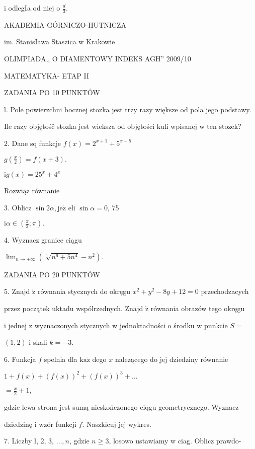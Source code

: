 \documentclass[a4paper,12pt]{article}
\begin{document}
i odlegIa od niej o $\displaystyle \frac{d}{3}.$






AKADEMIA GÓRNICZO-HUTNICZA

im. StanisIawa Staszica w Krakowie

OLIMPIADA,, O DIAMENTOWY INDEKS AGH'' 2009/10

MATEMATYKA- ETAP II

ZADANIA PO 10 PUNKTÓW

l. Pole powierzchni bocznej stozka jest trzy razy większe od pola jego podstawy.

Ile razy objętośč stozka jest wieksza od objętości kuli wpisanej w ten stozek?

2. Dane sq funkcje $f(x) =2^{x+1}+5^{x-5}$

$g(\displaystyle \frac{x}{2})=f(x+3).$

$\mathrm{i} g(x) =25^{x}+4^{x}$

Rozwiąz równanie

3. Oblicz $\sin 2\alpha, \mathrm{j}\mathrm{e}\dot{\mathrm{z}}$ eli $\sin\alpha=0$, 75

$\mathrm{i} \displaystyle \alpha\in(\frac{\pi}{2};\pi).$

4. Wyznacz granice ciągu

$\displaystyle \lim_{n\rightarrow+\infty}(\sqrt[3]{n^{6}+5n^{4}}-n^{2}).$

ZADANIA PO 20 PUNKTÓW

5. Znajd $\acute{\mathrm{z}}$ równania stycznych do okręgu $x^{2}+y^{2}-8y+12=0$ przechodzacych

przez początek uktadu wspólrzednych. Znajd $\acute{\mathrm{z}}$ równania obrazów tego okręgu

i jednej z wyznaczonych stycznych w jednoktadności o środku w punkcie $S=$

$(1,2)$ i skali $k=-3.$

6. Funkcja $f$ spelnia dla $\mathrm{k}\mathrm{a}\dot{\mathrm{z}}$ dego $x$ nalezącego do jej dziedziny równanie

$ 1+f(x)+(f(x))^{2}+(f(x))^{3}+\ldots$

$= \displaystyle \frac{x}{2}+1,$

gdzie lewa strona jest sumą nieskończonego ciqgu geometrycznego. Wyznacz

dziedzinę i wzór funkcji $f$. Naszkicuj jej wykres.

7. Liczby l, 2, 3, $\ldots, n$, gdzie $n\geq 3$, losowo ustawiamy w ciag. Oblicz prawdo-
\end{document}
